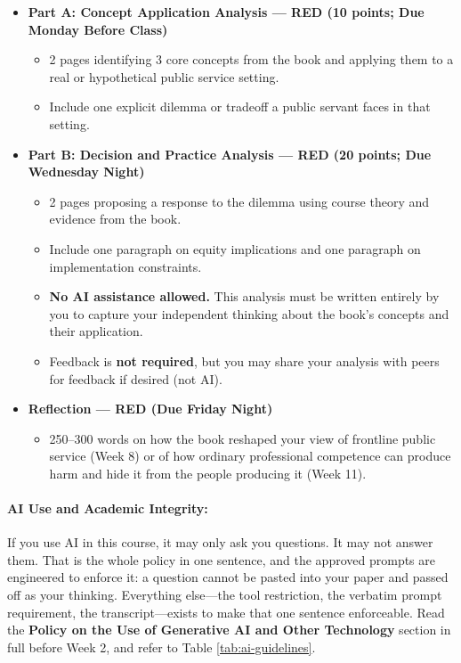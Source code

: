\documentclass[11pt]{article}     %
\begin{document}
\begin{itemize}
    \item \textbf{Part A: Concept Application Analysis --- RED (10 points; Due Monday Before Class)}
    \begin{itemize}
        \item 2 pages identifying 3 core concepts from the book and applying them to a real or hypothetical public service setting.
        \item Include one explicit dilemma or tradeoff a public servant faces in that setting.
    \end{itemize}

    \item \textbf{Part B: Decision and Practice Analysis --- RED (20 points; Due Wednesday Night)}
    \begin{itemize}
        \item 2 pages proposing a response to the dilemma using course theory and evidence from the book.
        \item Include one paragraph on equity implications and one paragraph on implementation constraints.
        \item \textbf{No AI assistance allowed.} This analysis must be written entirely by you to capture your independent thinking about the book's concepts and their application.
        \item Feedback is \textbf{not required}, but you may share your analysis with peers for feedback if desired (not AI).
    \end{itemize}

    \item \textbf{Reflection --- RED (Due Friday Night)}
    \begin{itemize}
        \item 250--300 words on how the book reshaped your view of frontline public service (Week 8) or of how ordinary professional competence can produce harm and hide it from the people producing it (Week 11).
    \end{itemize}
\end{itemize}

\paragraph*{AI Use and Academic Integrity:} If you use AI in this course, it may only ask you questions. It may not answer them. That is the whole policy in one sentence, and the approved prompts are engineered to enforce it: a question cannot be pasted into your paper and passed off as your thinking. Everything else---the tool restriction, the verbatim prompt requirement, the transcript---exists to make that one sentence enforceable. Read the \textbf{Policy on the Use of Generative AI and Other Technology} section in full before Week 2, and refer to Table \ref{tab:ai-guidelines}.
\end{document}
